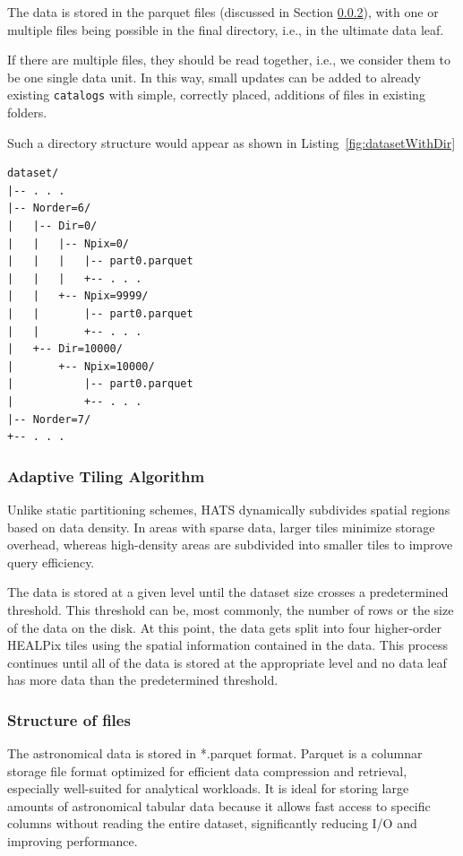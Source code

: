 \documentclass[11pt,a4paper]{ivoa}
\begin{document}
The data is stored in the parquet files (discussed in Section \ref{sec:parquet}), with one or multiple files being possible in the final directory, i.e., in the ultimate data leaf.  \par 
If there are multiple files, they should be read together, i.e., we consider them to be one single data unit. 
In this way, small updates can be added to already existing  \texttt{catalogs} with simple, correctly placed, additions of files in existing folders.

Such a directory structure would appear as shown in Listing~\ref{fig:datasetWithDir}

\begin{minipage}{\linewidth}
\begin{lstlisting}[caption=Example catalog dataset directory contents with leaf directories, label=fig:datasetWithDir]
dataset/
|-- . . .
|-- Norder=6/
|   |-- Dir=0/
|   |   |-- Npix=0/
|   |   |   |-- part0.parquet
|   |   |   +-- . . .
|   |   +-- Npix=9999/
|   |       |-- part0.parquet
|   |       +-- . . .
|   +-- Dir=10000/
|       +-- Npix=10000/
|           |-- part0.parquet
|           +-- . . .
|-- Norder=7/
+-- . . .
\end{lstlisting} 
\end{minipage} 

\subsubsection{Adaptive Tiling Algorithm} \label{sec:adaptive}
Unlike static partitioning schemes, HATS dynamically subdivides spatial regions based on data density. 
In areas with sparse data, larger tiles minimize storage overhead, whereas high-density areas are subdivided into smaller tiles to improve query efficiency. \par

The data is stored at a given level until the dataset size crosses a predetermined threshold. 
This threshold can be, most commonly, the number of rows or the size of the data on the disk. 
At this point, the data gets split into four higher-order HEALPix tiles using the spatial information contained in the data. 
This process continues until all of the data is stored at the appropriate level and no data leaf has more data than the predetermined threshold.

\subsubsection{Structure of files} \label{sec:parquet}
The astronomical data is stored in *.parquet format. 
Parquet is a columnar storage file format optimized for efficient data compression and retrieval, especially well-suited for analytical workloads. 
It is ideal for storing large amounts of astronomical tabular data because it allows fast access to specific columns without reading the entire dataset, significantly reducing I/O and improving performance. \par
\end{document}
